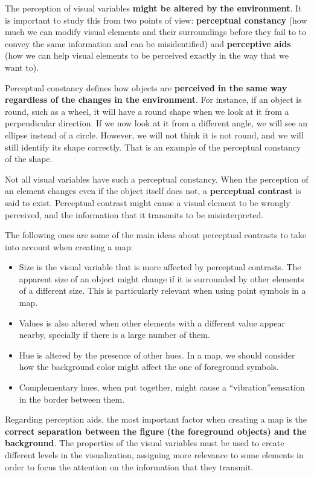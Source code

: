 The perception of visual variables \textbf{might be altered by the environment}. It is important to study this from two points of view: \textbf{perceptual constancy} (how much we can modify visual elements and their surroundings before they fail to to convey the same information and can be misidentified) and \textbf{perceptive aids} (how we can help visual elements to be perceived exactly in the way that we want to).

Perceptual constancy defines how objects are \textbf{perceived in the same way regardless of the changes in the environment}. For instance, if an object is round, such as a wheel, it will have a round shape when we look at it from a perpendicular direction. If we now look at it from a different angle, we will see an ellipse instead of a circle. However, we will not think it is not round, and we will still identify its shape correctly. That is an example of the perceptual constancy of the shape.

Not all visual variables have such a perceptual constancy. When the perception of an element changes even if the object itself does not, a \textbf{perceptual contrast} is said to exist. Perceptual contrast might cause a visual element to be wrongly perceived, and the information that it transmits to be misinterpreted.

The following ones are some of the main ideas about perceptual contrasts to take into account when creating a map:

\begin{itemize}
	\item Size is the visual variable that is more affected by perceptual contrasts. The apparent size of an object might change if it is surrounded by other elements of a different size. This is particularly relevant when using point symbols in a map.	
	\item Values is also altered when other elements with a different value appear nearby, specially if there is a large number of them.
	\item Hue is altered by the presence of other hues. In a map, we should consider how the background color might affect the one of foreground symbols. 
	\item Complementary hues, when put together, might cause a ``vibration''sensation in the border between them.
\end{itemize}

Regarding perception aids, the most important factor when creating a map is the \textbf{correct separation between the figure (the foreground objects) and the background}. The properties of the visual variables must be used to create different levels in the visualization, assigning more relevance to some elements in order to focus the attention on the information that they transmit.

